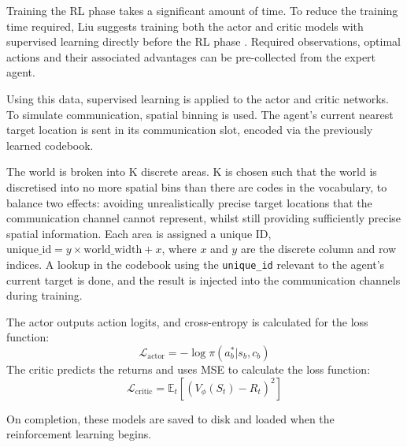 Training the RL phase takes a significant amount of time.
To reduce the training time required, Liu suggests training both the actor and critic models with supervised learning directly before the RL phase \cite{AIMotherTongue}.
Required observations, optimal actions and their associated advantages can be pre-collected from the expert agent.

Using this data, supervised learning is applied to the actor and critic networks.
To simulate communication, spatial binning is used.
The agent's current nearest target location is sent in its communication slot, encoded via the previously learned codebook.

The world is broken into K discrete areas.
K is chosen such that the world is discretised into no more spatial bins than there are codes in the vocabulary, to balance two effects: avoiding unrealistically precise target locations that the communication channel cannot represent, whilst still providing sufficiently precise spatial information.
Each area is assigned a unique ID, $\text{unique\_id} = y \times \text{world\_width} + x$, where $x$ and $y$ are the discrete column and row indices.
A lookup in the codebook using the \lstinline[language=Python]|unique_id| relevant to the agent's current target is done, and the result is injected into the communication channels during training.

The actor outputs action logits, and cross-entropy is calculated for the loss function:
\begin{equation}
    \mathcal{L}_\text{actor} = - \log \pi(a_b^* | s_b, c_b)
\end{equation}
The critic predicts the returns and uses MSE to calculate the loss function:
\begin{equation}
    \mathcal{L}_\text{critic} = \mathbb{E}_{t} \left[ (V_{\phi}(S_t) - R_t)^2 \right]
\end{equation}

On completion, these models are saved to disk and loaded when the reinforcement learning begins.



